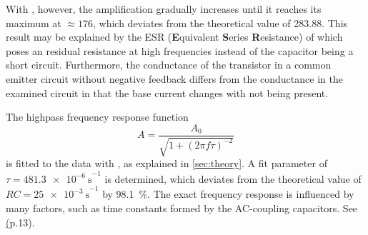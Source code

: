 With , however, the amplification gradually increases until it reaches its maximum at $\approx\num{176}$, which deviates from the theoretical value of \num{283.88}.
This result may be explained by the ESR (\textbf{E}quivalent \textbf{S}eries \textbf{R}esistance) of  which poses an residual resistance at high frequencies instead of the capacitor being a short circuit.
Furthermore, the conductance of the transistor in a common emitter circuit without negative feedback differs from the conductance in the examined circuit in that the base current changes with  not being present.

The highpass frequency response function
\begin{equation*}
	A=\frac{A_0}{\sqrt{1 + (2\pi f\tau)^{-2}}}
\end{equation*}
is fitted to the data with , as explained in \autoref{sec:theory}.
A fit parameter of $\tau=\SI{481.3e-6}{\second}^{-1}$ is determined, which deviates from the theoretical value of $RC=\SI{25e-3}{\second}^{-1}$ by \SI{98.1}{\percent}.
The exact frequency response is influenced by many factors, such as time constants formed by the AC-coupling capacitors.
See \hyperlink{http://whites.sdsmt.edu/classes/ee320/notes/320Lecture23.pdf} (p.13).
